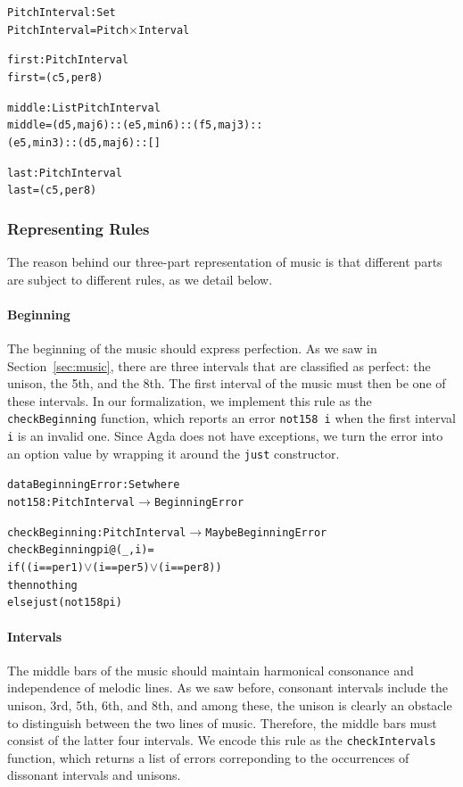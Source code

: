 \begin{alltt}
PitchInterval : Set
PitchInterval = Pitch \(\times\) Interval

first : PitchInterval
first = (c 5 , per8)

middle : List PitchInterval
middle = (d 5 , maj6) :: (e 5 , min6) :: (f 5 , maj3) ::
         (e 5 , min3) :: (d 5 , maj6) :: []

last : PitchInterval
last = (c 5 , per8)
\end{alltt}

\subsubsection{Representing Rules}

The reason behind our three-part representation of music is that
different parts are subject to different rules, as we detail below.

\paragraph{Beginning}

The beginning of the music should express perfection.
As we saw in Section~\ref{sec:music}, there are three intervals that
are classified as perfect: the unison, the 5th, and the 8th.
The first interval of the music must then be one of these intervals.
In our formalization, we implement this rule as the
\texttt{checkBeginning} function, which reports an error
\texttt{not158 i} when the first interval \texttt{i} is an invalid one.
Since Agda does not have exceptions, we turn the error into an option
value by wrapping it around the \texttt{just} constructor.

\begin{alltt}
data BeginningError : Set where
  not158   : PitchInterval \(\rightarrow\) BeginningError
  
checkBeginning : PitchInterval \(\rightarrow\) Maybe BeginningError
checkBeginning pi@(_ , i) =
  if ((i == per1) \(\vee\) (i == per5) \(\vee\) (i == per8))
  then nothing
  else just (not158 pi)
\end{alltt}

\paragraph{Intervals}

The middle bars of the music should maintain harmonical consonance
and independence of melodic lines.
As we saw before, consonant intervals include the unison, 3rd, 5th,
6th, and 8th, and among these, the unison is clearly an obstacle to
distinguish between the two lines of music.
Therefore, the middle bars must consist of the latter four intervals.
We encode this rule as the \texttt{checkIntervals} function, which
returns a list of errors correponding to the occurrences of dissonant
intervals and unisons.


